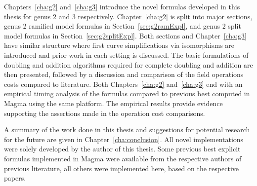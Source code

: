 Chapters~\ref{cha:g2} and~\ref{cha:g3} introduce the novel formulas
developed in this thesis for genus 2 and 3 respectively. Chapter~\ref{cha:g2} is
split into major sections, genus 2 ramified model formulas in
Section~\ref{sec:g2ramExpl}, and genus 2 split model formulas in
Section~\ref{sec:g2splitExpl}. Both sections and Chapter~\ref{cha:g3} have
similar structure where first curve simplifications via isomorphisms are
introduced and prior work in each setting is discussed. The basic formulations
of doubling and addition algorithms required for complete doubling and addition
are then presented, followed by a discussion and comparison of the field
operations costs compared to literature. Both Chapters~\ref{cha:g2}
and~\ref{cha:g3} end with an empirical timing analysis of the formulas compared to
previous best computed in Magma using the same platform. The empirical results
provide evidence supporting the assertions made in the operation cost
comparisons.

A summary of the work done in this thesis and suggestions for potential research
for the future are given in Chapter~\ref{cha:conclusion}. All novel
implementations were solely developed by the author of this thesis. Some
previous best explicit formulas implemented in Magma were available from the
respective authors of previous literature, all others were implemented here,
based on the respective papers.

